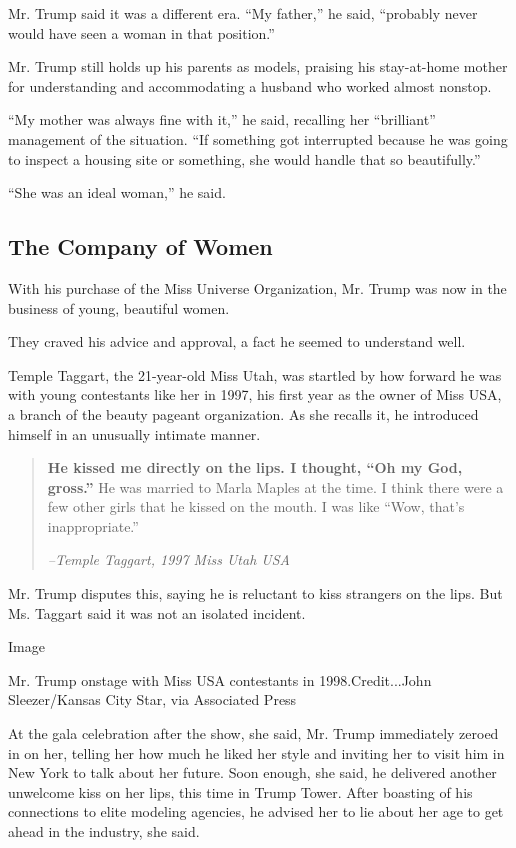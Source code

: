 Mr. Trump said it was a different era. ``My father,'' he said,
``probably never would have seen a woman in that position.''

Mr. Trump still holds up his parents as models, praising his
stay-at-home mother for understanding and accommodating a husband who
worked almost nonstop.

``My mother was always fine with it,'' he said, recalling her
``brilliant'' management of the situation. ``If something got
interrupted because he was going to inspect a housing site or something,
she would handle that so beautifully.''

``She was an ideal woman,'' he said.

\hypertarget{the-company-of-women}{%
\subsection{The Company of Women}\label{the-company-of-women}}

With his purchase of the Miss Universe Organization, Mr. Trump was now
in the business of young, beautiful women.

They craved his advice and approval, a fact he seemed to understand
well.

Temple Taggart, the 21-year-old Miss Utah, was startled by how forward
he was with young contestants like her in 1997, his first year as the
owner of Miss USA, a branch of the beauty pageant organization. As she
recalls it, he introduced himself in an unusually intimate manner.

\begin{quote}
\textbf{He kissed me directly on the lips. I thought, ``Oh my God,
gross.''} He was married to Marla Maples at the time. I think there were
a few other girls that he kissed on the mouth. I was like ``Wow, that's
inappropriate.''

\emph{--Temple Taggart, 1997 Miss Utah USA}
\end{quote}

Mr. Trump disputes this, saying he is reluctant to kiss strangers on the
lips. But Ms. Taggart said it was not an isolated incident.

Image

Mr. Trump onstage with Miss USA contestants in 1998.Credit...John
Sleezer/Kansas City Star, via Associated Press

At the gala celebration after the show, she said, Mr. Trump immediately
zeroed in on her, telling her how much he liked her style and inviting
her to visit him in New York to talk about her future. Soon enough, she
said, he delivered another unwelcome kiss on her lips, this time in
Trump Tower. After boasting of his connections to elite modeling
agencies, he advised her to lie about her age to get ahead in the
industry, she said.

